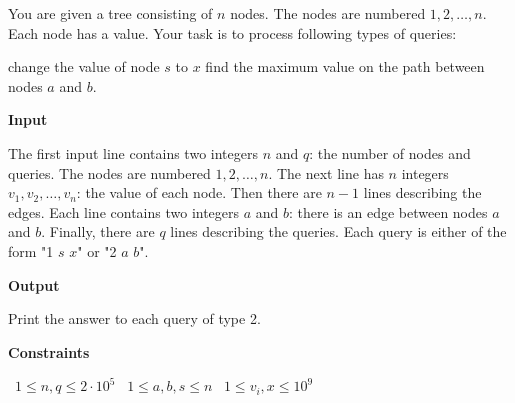 You are given a tree consisting of $n$ nodes. The nodes are numbered $1,2,\ldots,n$. Each node has a value.
Your task is to process following types of queries:

change the value of node $s$ to $x$
find the maximum value on the path between nodes $a$ and $b$.

\vspace{0.3cm}\noindent\textbf{Input}

The first input line contains two integers $n$ and $q$: the number of nodes and queries. The nodes are numbered $1,2,\ldots,n$.
The next line has $n$ integers $v_1,v_2,\ldots,v_n$: the value of each node.
Then there are $n-1$ lines describing the edges. Each line contains two integers $a$ and $b$: there is an edge between nodes $a$ and $b$.
Finally, there are $q$ lines describing the queries. Each query is either of the form "1 $s$ $x$" or "2 $a$ $b$".

\vspace{0.3cm}\noindent\textbf{Output}

Print the answer to each query of type 2.

\vspace{0.3cm}\noindent\textbf{Constraints}

\textbullet\ $1 \le n, q \le 2 \cdot 10^5$
\textbullet\ $1 \le a,b, s \le n$
\textbullet\ $1 \le v_i, x \le 10^9$